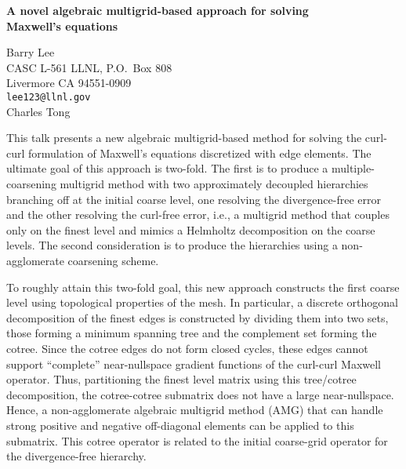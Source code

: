 \documentclass[twosided]{report}
\begin{document}
\begin{center}
{\large			%
{\bf A novel algebraic multigrid-based approach for solving \\
	Maxwell's equations}}

	Barry Lee \\
	CASC L-561 LLNL, P.O.~Box 808 \\
	Livermore CA 94551-0909 \\
	{\tt lee123@llnl.gov} \\
	Charles Tong
\end{center}
This talk presents a new algebraic multigrid-based method
for solving the curl-curl formulation of Maxwell's equations
discretized with edge elements. The ultimate goal of this
approach is two-fold. The first is to produce a
multiple-coarsening multigrid method with two approximately
decoupled hierarchies branching off at the initial coarse
level, one resolving the divergence-free error and the other
resolving the curl-free error, i.e., a multigrid method that
couples only on the finest level and mimics a Helmholtz
decomposition on the coarse levels. The second consideration
is to produce the hierarchies using a non-agglomerate
coarsening scheme.

To roughly attain this two-fold goal,
this new approach constructs the first coarse level using
topological properties of the mesh. In particular, a
discrete orthogonal decomposition of the finest edges is
constructed by dividing them into two sets, those forming a
minimum spanning tree and the complement set forming the
cotree. Since the cotree edges do not form closed cycles,
these edges cannot support ``complete'' near-nullspace
gradient functions of the curl-curl Maxwell operator. Thus,
partitioning the finest level matrix using this tree/cotree
decomposition, the cotree-cotree submatrix does not have a
large near-nullspace. Hence, a non-agglomerate algebraic
multigrid method (AMG) that can handle strong positive and
negative off-diagonal elements can be applied to this
submatrix. This cotree operator is related to the initial
coarse-grid operator for the divergence-free hierarchy.
\end{document}
